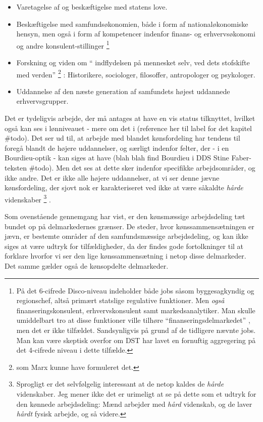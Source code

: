 %
\begin{itemize}
 \itemsep -0.5em
   \item Varetagelse af og beskæftigelse med statens love.
   \item Beskæftigelse med samfundsøkonomien, både i form af nationaløkonomiske hensyn, men også i form af kompetencer indenfor finans- og erhvervsøkonomi og andre konsulent-stillinger%
   \footnote{ \label{d2419 forklaring} På det 6-cifrede Disco-niveau indeholder  både jobs såsom byggesagkyndig og regionschef, altså primært statslige regulative funktioner. Men \emph{også} finanseringskonsulent, erhvervskonsulent samt markedsanalytiker. Man skulle umiddelbart tro at disse funktioner ville tilhøre “finanseringsdelmarkedet” , men det er ikke tilfældet. Sandsynligvis på grund af de tidligere nævnte jobs. Man kan være skeptisk overfor om DST har lavet en fornuftig aggregering på det 4-cifrede niveau i dette tilfælde.}%
   \item Forskning og viden om “ indflydelsen på mennesket selv, ved dets stofskifte med verden”%
   \footnote{ som Marx kunne have formuleret det.}%
    : Historikere, sociologer, filosoffer, antropologer og psykologer.    
   \item Uddannelse af den næste generation af samfundets højest uddannede erhvervsgrupper. 
\end{itemize}
%

Det er tydeligvis arbejde, der må antages at have en vis status tilknyttet, hvilket også kan ses i lønniveauet - mere om det i (reference her til label for det kapitel \#todo).  Det ser ud til, at arbejde med blandet kønsfordeling har tendens til foregå blandt de højere uddannelser, og særligt indenfor felter, der - i en Bourdieu-optik - kan siges at have (blah blah find Bourdieu i DDS Stine Faber-teksten \#todo). Men det ses at dette sker indenfor specifikke arbejdsområder, og ikke andre. Det er ikke alle højere uddannelser, at vi ser denne jævne kønsfordeling, der sjovt nok er karakteriseret ved ikke at være såkaldte \emph{hårde} videnskaber%
%
\footnote{ Sprogligt er det selvfølgelig interessant at de netop kaldes de \emph{hårde} videnskaber. Jeg mener ikke det er urimeligt at se på dette som et udtryk for den kønnede arbejdsdeling: Mænd arbejder med \emph{hård} videnskab, og de laver \emph{hårdt} fysisk arbejde, og så videre.}%
%
 . 



Som ovenstående gennemgang har vist, er den kønsmæssige arbejdsdeling tæt bundet op på delmarkedernes grænser. De steder, hvor kønssammensætningen er jævn, er bestemte områder af den samfundsmæssige arbejdsdeling, og kan ikke siges at være udtryk for tilfældigheder, da der findes gode fortolkninger til at forklare hvorfor vi ser den lige kønssammensætning i netop disse delmarkeder. Det samme gælder også de kønsopdelte delmarkeder.

